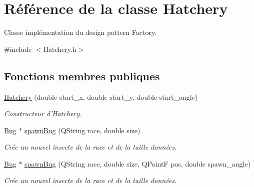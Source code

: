 \hypertarget{classHatchery}{
\section{Référence de la classe Hatchery}
\label{classHatchery}
}


Classe implémentation du design pattern Factory.  




{\ttfamily \#include $<$Hatchery.h$>$}

\subsection*{Fonctions membres publiques}
\begin{DoxyCompactItemize}
\item 
\hyperlink{classHatchery_a8e86b7578b70f37fb3f7ed2e69c765b7}{Hatchery} (double start\_\-x, double start\_\-y, double start\_\-angle)
\begin{DoxyCompactList}\small\item\em Constructeur d'Hatchery. \end{DoxyCompactList}\item 
\hyperlink{classBug}{Bug} $\ast$ \hyperlink{classHatchery_af90645b2be3e8890829a69347846a934}{spawnBug} (QString race, double size)
\begin{DoxyCompactList}\small\item\em Crée un nouvel insecte de la race et de la taille données. \end{DoxyCompactList}\item 
\hyperlink{classBug}{Bug} $\ast$ \hyperlink{classHatchery_ad062be27d539081dd061eec1898df12b}{spawnBug} (QString race, double size, QPointF pos, double spawn\_\-angle)
\begin{DoxyCompactList}\small\item\em Crée un nouvel insecte de la race et de la taille données. \end{DoxyCompactList}\end{DoxyCompactItemize}
